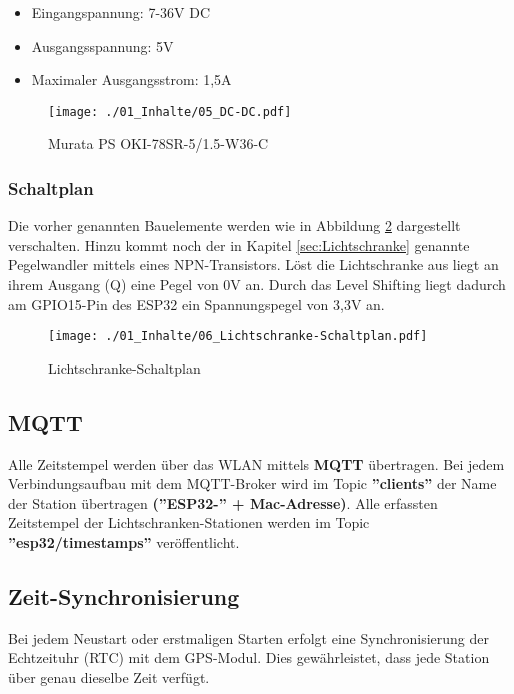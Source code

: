 \begin{minipage}{0.45\textwidth}
	\begin{itemize}
		\item Eingangspannung: 7-36V DC
		\item Ausgangsspannung: 5V
		\item Maximaler Ausgangsstrom: 1,5A
	\end{itemize}
\end{minipage}%
\begin{minipage}{0.55\textwidth}		
	\begin{figure}[H]
		\texttt{[image: ./01\_Inhalte/05\_DC-DC.pdf]}	
		\centering
		\caption{Murata PS OKI-78SR-5/1.5-W36-C}
		\label{fig:DC-DC}
	\end{figure}
\end{minipage}	


\subsubsection{Schaltplan}
Die vorher genannten Bauelemente werden wie in Abbildung \ref{fig:Lichtschranke-Schaltplan} dargestellt verschalten. Hinzu kommt noch der in Kapitel \ref{sec:Lichtschranke} genannte Pegelwandler mittels eines NPN-Transistors. Löst die Lichtschranke aus liegt an ihrem Ausgang (Q) eine Pegel von 0V an. Durch das Level Shifting liegt dadurch am GPIO15-Pin des ESP32 ein Spannungspegel von 3,3V an.

\begin{figure}[H]
	\texttt{[image: ./01\_Inhalte/06\_Lichtschranke-Schaltplan.pdf]}	
	\centering
	\caption{Lichtschranke-Schaltplan}
	\label{fig:Lichtschranke-Schaltplan}
\end{figure}


\subsection{MQTT}
Alle Zeitstempel werden über das WLAN mittels \textbf{MQTT} übertragen. Bei jedem Verbindungsaufbau mit dem MQTT-Broker wird im Topic \textbf{''clients''} der Name der Station übertragen \textbf{(''ESP32-'' + Mac-Adresse)}. Alle erfassten Zeitstempel der Lichtschranken-Stationen werden im Topic \textbf{''esp32/timestamps''} veröffentlicht. 

\subsection{Zeit-Synchronisierung}
Bei jedem Neustart oder erstmaligen Starten erfolgt eine Synchronisierung der Echtzeituhr (\ac{RTC}) mit dem GPS-Modul. Dies gewährleistet, dass jede Station über genau dieselbe Zeit verfügt.

